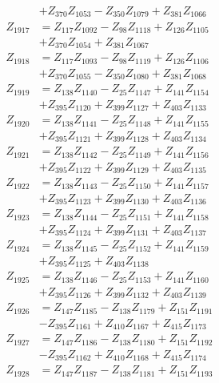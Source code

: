 \begin{multicols}{2}
\begin{align}
&+ Z_{370}Z_{1053} - Z_{350}Z_{1079} + Z_{381}Z_{1066} \nonumber \\
Z_{1917} &= Z_{117}Z_{1092} - Z_{98}Z_{1118} + Z_{126}Z_{1105}  \nonumber \\
&+ Z_{370}Z_{1054} + Z_{381}Z_{1067} \nonumber \\
Z_{1918} &= Z_{117}Z_{1093} - Z_{98}Z_{1119} + Z_{126}Z_{1106}  \nonumber \\
&+ Z_{370}Z_{1055} - Z_{350}Z_{1080} + Z_{381}Z_{1068} \nonumber \\
Z_{1919} &= Z_{138}Z_{1140} - Z_{25}Z_{1147} + Z_{141}Z_{1154}  \nonumber \\
&+ Z_{395}Z_{1120} + Z_{399}Z_{1127} + Z_{403}Z_{1133} \nonumber \\
Z_{1920} &= Z_{138}Z_{1141} - Z_{25}Z_{1148} + Z_{141}Z_{1155}  \nonumber \\
&+ Z_{395}Z_{1121} + Z_{399}Z_{1128} + Z_{403}Z_{1134} \nonumber \\
Z_{1921} &= Z_{138}Z_{1142} - Z_{25}Z_{1149} + Z_{141}Z_{1156}  \nonumber \\
&+ Z_{395}Z_{1122} + Z_{399}Z_{1129} + Z_{403}Z_{1135} \nonumber \\
Z_{1922} &= Z_{138}Z_{1143} - Z_{25}Z_{1150} + Z_{141}Z_{1157}  \nonumber \\
&+ Z_{395}Z_{1123} + Z_{399}Z_{1130} + Z_{403}Z_{1136} \nonumber \\
Z_{1923} &= Z_{138}Z_{1144} - Z_{25}Z_{1151} + Z_{141}Z_{1158}  \nonumber \\
&+ Z_{395}Z_{1124} + Z_{399}Z_{1131} + Z_{403}Z_{1137} \nonumber \\
Z_{1924} &= Z_{138}Z_{1145} - Z_{25}Z_{1152} + Z_{141}Z_{1159}  \nonumber \\
&+ Z_{395}Z_{1125} + Z_{403}Z_{1138} \nonumber \\
Z_{1925} &= Z_{138}Z_{1146} - Z_{25}Z_{1153} + Z_{141}Z_{1160}  \nonumber \\
&+ Z_{395}Z_{1126} + Z_{399}Z_{1132} + Z_{403}Z_{1139} \nonumber \\
Z_{1926} &= Z_{147}Z_{1185} - Z_{138}Z_{1179} + Z_{151}Z_{1191}  \nonumber \\
&- Z_{395}Z_{1161} + Z_{410}Z_{1167} + Z_{415}Z_{1173} \nonumber \\
Z_{1927} &= Z_{147}Z_{1186} - Z_{138}Z_{1180} + Z_{151}Z_{1192}  \nonumber \\
&- Z_{395}Z_{1162} + Z_{410}Z_{1168} + Z_{415}Z_{1174} \nonumber \\
Z_{1928} &= Z_{147}Z_{1187} - Z_{138}Z_{1181} + Z_{151}Z_{1193}  \nonumber \\

\end{align}
\end{multicols}
